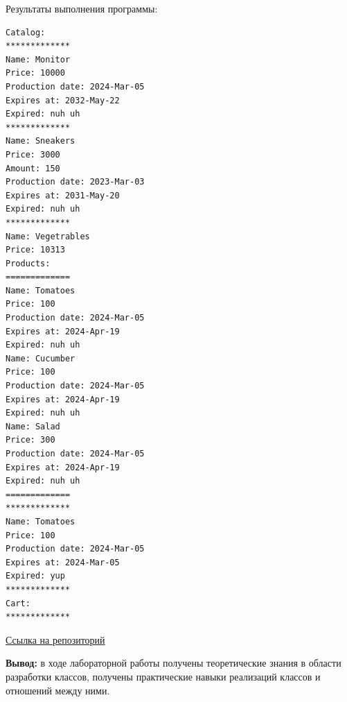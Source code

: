 \documentclass[a4paper,14pt]{extarticle}
\begin{document}
Результаты выполнения программы:
\begin{verbatim}
Catalog: 
*************
Name: Monitor
Price: 10000
Production date: 2024-Mar-05
Expires at: 2032-May-22
Expired: nuh uh
*************
Name: Sneakers
Price: 3000
Amount: 150
Production date: 2023-Mar-03
Expires at: 2031-May-20
Expired: nuh uh
*************
Name: Vegetrables
Price: 10313
Products:
=============
Name: Tomatoes
Price: 100
Production date: 2024-Mar-05
Expires at: 2024-Apr-19
Expired: nuh uh
Name: Cucumber
Price: 100
Production date: 2024-Mar-05
Expires at: 2024-Apr-19
Expired: nuh uh
Name: Salad
Price: 300
Production date: 2024-Mar-05
Expires at: 2024-Apr-19
Expired: nuh uh
=============
*************
Name: Tomatoes
Price: 100
Production date: 2024-Mar-05
Expires at: 2024-Mar-05
Expired: yup
*************
Cart: 
*************
\end{verbatim}
\href{https://github.com/IAmProgrammist/oop/tree/master}{Ссылка на репозиторий}

\textbf{Вывод: } в ходе лабораторной работы получены теоретические знания в области
разработки классов, получены практические навыки реализаций классов
и отношений между ними.
\end{document}
